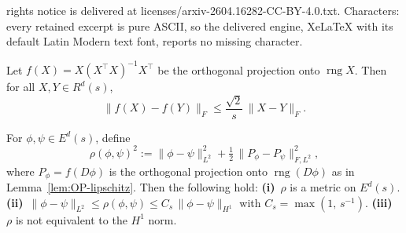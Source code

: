 \documentclass[10pt,a4paper]{amsart}
\newcommand{\norm}[1]{\lVert#1\rVert}
\newcommand{\rng}{\operatorname{rng}}
\begin{document}
rights notice is delivered at licenses/arxiv-2604.16282-CC-BY-4.0.txt. Characters: every retained excerpt is pure ASCII, so the delivered engine, XeLaTeX with its default Latin Modern text font, reports no missing character.
\begin{lem}\label{lem:OP-lipschitz}
  Let $f(X) = X(X^\top X)^{-1}X^\top$ be the orthogonal projection onto
  $\rng X$.
  Then for all $X,Y\in R^d(s)$,
  \[
    \norm{f(X)-f(Y)}_F
    \le \frac{\sqrt{2}}{s}\,\norm{X-Y}_F.
  \]
\end{lem}

\begin{lem}\label{lem:rho-metric}
  For $\phi,\psi\in E^d(s)$, define
  \[
    \rho(\phi,\psi)^2
    := \norm{\phi-\psi}_{L^2}^2
     + \tfrac{1}{2}\,\norm{P_\phi - P_\psi}_{F,L^2}^2,
  \]
  where $P_\phi = f(D\phi)$ is the orthogonal projection onto
  $\rng(D\phi)$ as in Lemma~\ref{lem:OP-lipschitz}.
  Then the following hold:
  \textup{\textbf{(i)}}~$\rho$ is a metric on $E^d(s)$.\quad
  \textup{\textbf{(ii)}}~$\norm{\phi-\psi}_{L^2} \le \rho(\phi,\psi) \le
    C_s\,\norm{\phi-\psi}_{H^1}$
    with $C_s = \max(1,\,s^{-1})$.\quad
  \textup{\textbf{(iii)}}~$\rho$ is not equivalent to the $H^1$ norm.
\end{lem}
\end{document}
